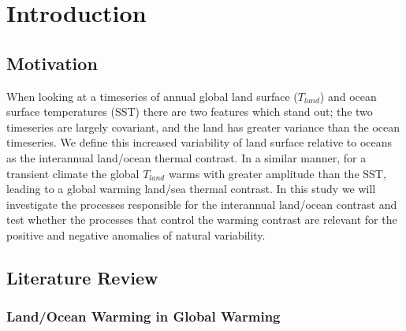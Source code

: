 \chapter{Introduction} %

\label{introduction} %



\section{Motivation}

When looking at a timeseries of annual global land surface ($T_{land}$) and 
ocean surface temperatures (SST) there are two features which stand out; the two 
timeseries are largely covariant, and the land has greater variance than the 
ocean timeseries.  We define this increased variability of land surface relative 
to oceans as the interannual land/ocean thermal contrast. In a similar manner, 
for a transient climate the global $T_{land}$ warms with greater amplitude than 
the SST, leading to a global warming land/sea thermal contrast. In this study we 
will investigate the processes responsible for the interannual land/ocean 
contrast and test whether the processes that control the warming contrast are 
relevant for the positive and negative anomalies of natural variability.

\section{Literature Review}

\subsection{Land/Ocean Warming in Global Warming}

